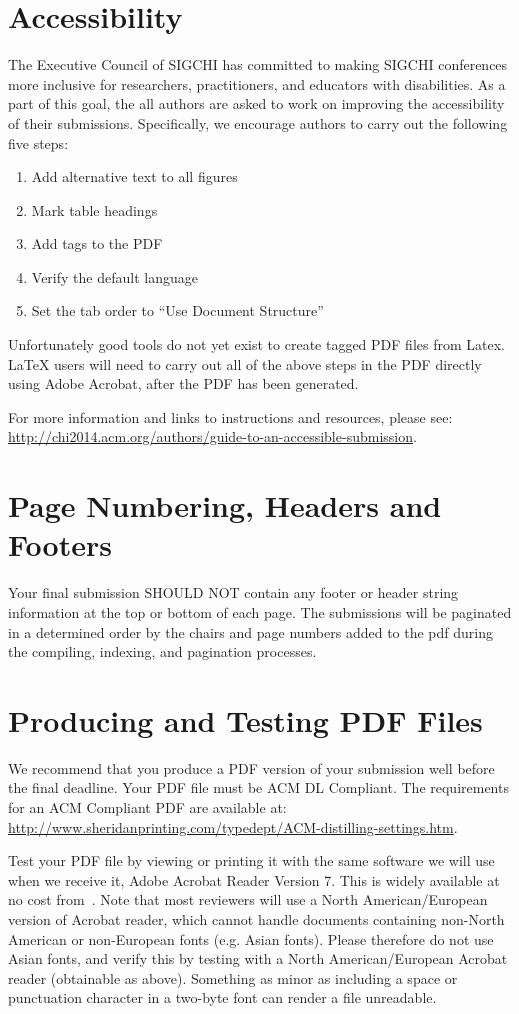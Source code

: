 \documentclass{sigchi}
\begin{document}
\section{Accessibility}
The Executive Council of SIGCHI has committed to making SIGCHI conferences more inclusive for researchers, practitioners, and educators with disabilities. As a part of this goal, the all authors are asked to work on improving the accessibility of their submissions. Specifically, we encourage authors to carry out the following five steps:
\begin{enumerate}
	\item Add alternative text to all figures
	\item Mark table headings
	\item Add tags to the PDF
	\item Verify the default language
	\item Set the tab order to ``Use Document Structure''
\end{enumerate}
Unfortunately good tools do not yet exist to create tagged PDF files from Latex. LaTeX users will need to carry out all of the above steps in the PDF directly using Adobe Acrobat, after the PDF has been generated.
 
For more information and links to instructions and resources, please see:
{\url{http://chi2014.acm.org/authors/guide-to-an-accessible-submission}}.

\section{Page Numbering, Headers and Footers}
Your final submission SHOULD NOT contain any footer or header string information 
at the top or bottom of each page. The submissions will be paginated in a determined 
order by the chairs and page numbers added to the pdf during the compiling, 
indexing, and pagination processes.

\section{Producing and Testing PDF Files}

We recommend that you produce a PDF version of your submission well
before the final deadline.  Your PDF file must be ACM DL
Compliant. The requirements for an ACM Compliant PDF are available at:
{\url{http://www.sheridanprinting.com/typedept/ACM-distilling-settings.htm}}.

Test your PDF file by viewing or printing it with the same software we
will use when we receive it, Adobe Acrobat Reader Version 7. This is
widely available at no cost from~\cite{acrobat}.  Note that most
reviewers will use a North American/European version of Acrobat
reader, which cannot handle documents containing non-North American or
non-European fonts (e.g. Asian fonts).  Please therefore do not use
Asian fonts, and verify this by testing with a North American/European
Acrobat reader (obtainable as above). Something as minor as including
a space or punctuation character in a two-byte font can render a file
unreadable.
\end{document}
